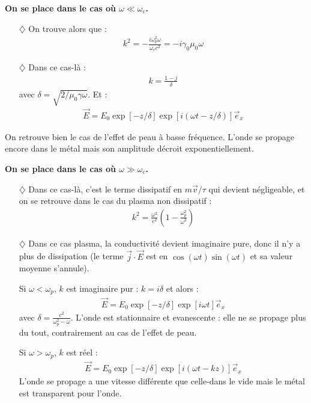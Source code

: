 \documentclass{report}
\begin{document}
\textbf{On se place dans le cas où $\omega\ll\omega_c$.}

\begin{itemize}

	\item[$\diamondsuit$] On trouve alors que :
	\begin{align*}
		k^2=-\frac{i\omega_p^2\omega}{\omega_cc^2}=-i\gamma_0\mu_0\omega
	\end{align*}

	\item[$\diamondsuit$] Dans ce cas-là :
	\begin{align*}
		k = \frac{1-j}{\delta}
	\end{align*}
	avec $\delta=\sqrt{2/\mu_0\gamma\omega}$.
	Et :
	\begin{align}
     	\vec{E}=E_{0}\exp[-z/\delta]\exp[i(\omega t-z/\delta)]\vec{e}_x
	\end{align}
\end{itemize}
On retrouve bien le cas de l'effet de peau à basse fréquence. L'onde se propage encore dans le métal mais son amplitude décroit exponentiellement.

\textbf{On se place dans le cas où $\omega\gg\omega_c$.}

\begin{itemize}

	\item[$\diamondsuit$] Dans ce cas-là, c'est le terme dissipatif en $m\vec{v}/\tau$ qui devient négligeable, et on se retrouve dans le cas du plasma non dissipatif :
	\begin{align*}
		k^2=\frac{\omega^2}{c^2}\left( 1-\frac{\omega_p^2}{\omega^2}\right) 
	\end{align*}
	
	\item[$\diamondsuit$] Dans ce cas plasma, la conductivité devient imaginaire pure, donc il n'y a plus de dissipation (le terme $\vec{j}\cdot\vec{E}$ est en $\cos(\omega t)\sin(\omega t)$ et sa valeur moyenne s'annule).
	
	Si $\omega<\omega_p$, $k$ est imaginaire pur : $k=i\delta$ et alors :
	\begin{align}
     	\vec{E}=E_{0}\exp[-z/\delta]\exp[i\omega t]\vec{e}_x
	\end{align}
	avec $\delta = \frac{c^2}{\omega_p^2-\omega}$. L'onde est stationnaire et evanescente : elle ne se propage plus du tout, contrairement au cas de l'effet de peau. 
	
	Si $\omega>\omega_p$, $k$ est réel : 
	\begin{align}
     	\vec{E}=E_{0}\exp[-z/\delta]\exp[i(\omega t-kz)]\vec{e}_x
	\end{align}
L'onde se propage a une vitesse différente que celle-dans le vide mais le métal est transparent pour l'onde.

\end{itemize}
\end{document}

